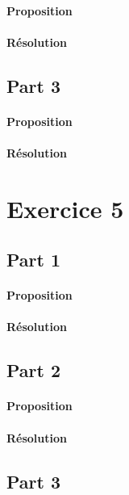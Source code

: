 \documentclass{article}
\begin{document}
\paragraph{Proposition}

\paragraph{Résolution}


\subsection{Part 3}
\paragraph{Proposition}

\paragraph{Résolution}



\section{Exercice 5}
\subsection{Part 1}
\paragraph{Proposition}

\paragraph{Résolution}


\subsection{Part 2}
\paragraph{Proposition}

\paragraph{Résolution}


\subsection{Part 3}
\end{document}
